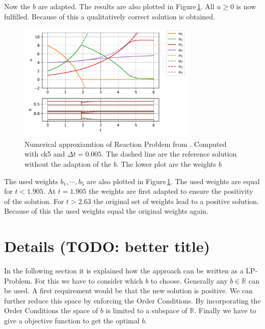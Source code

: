 \documentclass{article}
\begin{document}
Now the $b$ are adapted. The results are also plotted in Figure\,\ref{fig:exampleI}. 
All $u\geq0$ is now fulfilled. Because of this a qualitatively correct solution is obtained.

\begin{figure}[h]
    \centering
    \includegraphics[width=0.75\textwidth]{plots/exampleI.pdf}
    \caption{Numerical approxiamtion of Reaction Problem from \cite{kopecz_comparison_2019}. Computed with ck5 and $\Delta t = 0.005$. The dashed line are the reference solution without the adaption of the $b$. The lower plot are the weights $b$ }
    \label{fig:exampleI}
\end{figure}

The used weights $b_1,\cdots,b_5$ are also plotted in Figure\,\ref{fig:exampleI}. 
The used weights are equal for $t<1.905$. At $t=1.905$ the weights are first adapted to ensure the positivity of the solution. For $t>2.63$ the original set of weights lead to a positive solution. Because of this the used weights equal the original weights again.


\section{Details (TODO: better title)}\label{sec:LP-Problem}

In the following section it is explained how the approach can be written as a LP-Problem. 
For this we have to consider which $b$ to choose. 
Generally any $b \in \mathbb{R}$ can be used. 
A first requirement would be that the new solution is positive.
We can further reduce this space by enforcing the Order Conditions. 
By incorporating the Order Conditions the space of $b$ is limited to a subspace of $\mathbb{R}$. %
Finally we have to give a objective function to get the optimal $b$.
\end{document}
